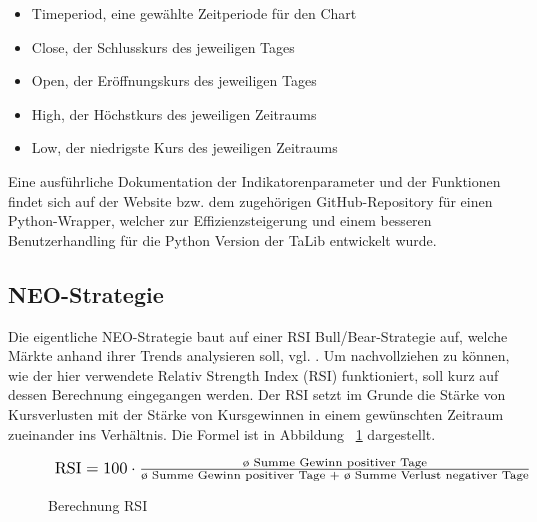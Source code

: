 \begin{itemize}
	\item Timeperiod, eine gewählte Zeitperiode für den Chart
	\item Close, der Schlusskurs des jeweiligen Tages
	\item Open, der Eröffnungskurs des jeweiligen Tages
	\item High, der Höchstkurs des jeweiligen Zeitraums
	\item Low, der niedrigste Kurs des jeweiligen Zeitraums
\end{itemize}

Eine ausführliche Dokumentation der Indikatorenparameter und der Funktionen findet sich auf der Website bzw. dem zugehörigen GitHub-Repository \cite{mrj20} für einen Python-Wrapper, welcher zur Effizienzsteigerung und einem besseren Benutzerhandling für die Python Version der TaLib entwickelt wurde.

\subsection{NEO-Strategie}
\label{sec:neo-strategie}Die eigentliche NEO-Strategie baut auf einer RSI Bull/Bear-Strategie auf, welche Märkte anhand ihrer Trends analysieren soll, vgl. \cite{pro19}. Um nachvollziehen zu können, wie der hier verwendete Relativ Strength Index (RSI) funktioniert, soll kurz auf dessen Berechnung eingegangen werden. Der RSI setzt im Grunde die Stärke von Kursverlusten mit der Stärke von Kursgewinnen in einem gewünschten Zeitraum zueinander ins Verhältnis. Die Formel ist in Abbildung ~\ref{Berechnung_RSI} dargestellt.\\ 
%
\begin{figure}[!ht]
\begin{equation*}
\resizebox{\columnwidth}{!}{
$\text{RSI}=100\cdot\frac{\text{\o\ Summe Gewinn positiver Tage}}{\text{\o\ Summe Gewinn positiver Tage }+\text{ \o\ Summe Verlust negativer Tage}}$}
\end{equation*}
\caption{Berechnung RSI}
\label{Berechnung_RSI}
\end{figure}
%

